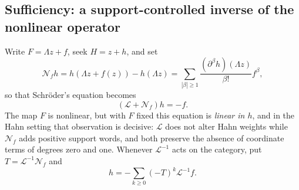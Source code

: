 \documentclass[11pt,letterpaper]{article}
\theoremstyle{definition}
\theoremstyle{remark}
\newcommand{\Li}{\mathcal L}
\newcommand{\NN}{\mathcal N}
\numberwithin{equation}{section}
\begin{document}
\subsection{Sufficiency: a support-controlled inverse of the nonlinear operator}
Write $F=\Lambda z+f$, seek $H=z+h$, and set
\begin{equation}\label{dyn:eq:Noperator}
 \NN_fh=h(\Lambda z+f(z))-h(\Lambda z)
 =\sum_{|\beta|\ge1}\frac{(\partial^{\beta}h)(\Lambda z)}{\beta!}f^{\beta},
\end{equation}
so that Schr\"oder's equation becomes
\begin{equation}\label{dyn:eq:linear-Schroeder}
 (\Li+\NN_f)h=-f .
\end{equation}
The map $F$ is nonlinear, but with $F$ fixed this equation is \emph{linear
in $h$}, and in the Hahn setting that observation is decisive: $\Li$ does
not alter Hahn weights while $\NN_f$ adds positive support words, and both
preserve the absence of coordinate terms of degrees zero and one. Whenever
$\Li^{-1}$ acts on the category, put $T=\Li^{-1}\NN_f$ and
\begin{equation}\label{dyn:eq:linearizer-series}
 h=-\sum_{k\ge0}(-T)^{k}\Li^{-1}f .
\end{equation}
\end{document}
